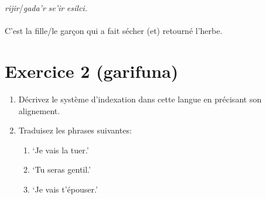 \documentclass[oldfontcommands,twoside,a4paper,12pt]{article}
\newcommand{\ipa}[1]{{\phon\textit{#1}}}
\begin{document}
\begin{exe}
\ex
\gll \ipa{Xhın} \ipa{rijir}/\ipa{gada'r} \ipa{se’ir} \ipa{esilci.}\\
\\
\glt C’est la fille/le garçon qui a fait sécher (et) retourné l’herbe.
\end{exe} 


\section*{Exercice 2 (garifuna)}

\begin{enumerate}
\item Décrivez le système d'indexation dans cette langue en précisant son alignement.
\item Traduisez les phrases suivantes: 
\begin{enumerate}
\item `Je vais la tuer.'
\item `Tu seras gentil.'
\item `Je vais t'épouser.'
\end{enumerate}
\end{enumerate}
\end{document}
